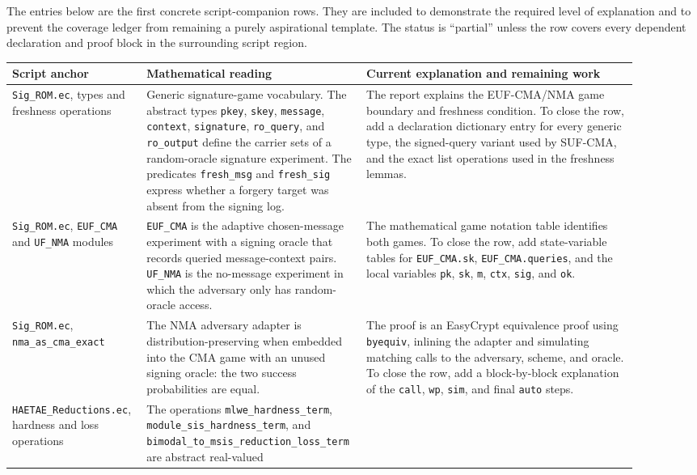 \documentclass[11pt]{report}
\DeclareRobustCommand{\file}[1]{\ifmmode\text{\nolinkurl{#1}}\else\nolinkurl{#1}\fi}
\DeclareRobustCommand{\ec}[1]{\ifmmode\text{\nolinkurl{#1}}\else\nolinkurl{#1}\fi}
\theoremstyle{definition}
\theoremstyle{plain}
\begin{document}
The entries below are the first concrete script-companion rows.  They are
included to demonstrate the required level of explanation and to prevent the
coverage ledger from remaining a purely aspirational template.  The status is
``partial'' unless the row covers every dependent declaration and proof block in
the surrounding script region.

\begin{longtable}{p{0.20\linewidth}p{0.28\linewidth}p{0.42\linewidth}}
\toprule
\textbf{Script anchor} & \textbf{Mathematical reading} & \textbf{Current explanation and remaining work} \\
\midrule
\file{Sig\_ROM.ec}, types and freshness operations &
Generic signature-game vocabulary.  The abstract types
\ec{pkey}, \ec{skey}, \ec{message}, \ec{context}, \ec{signature},
\ec{ro\_query}, and \ec{ro\_output} define the carrier sets of a random-oracle
signature experiment.  The predicates \ec{fresh\_msg} and \ec{fresh\_sig}
express whether a forgery target was absent from the signing log. &
The report explains the EUF-CMA/NMA game boundary and freshness condition.
To close the row, add a declaration dictionary entry for every generic type,
the signed-query variant used by SUF-CMA, and the exact list operations used in
the freshness lemmas. \\
\midrule
\file{Sig\_ROM.ec}, \ec{EUF\_CMA} and \ec{UF\_NMA} modules &
\ec{EUF\_CMA} is the adaptive chosen-message experiment with a signing oracle
that records queried message-context pairs.  \ec{UF\_NMA} is the no-message
experiment in which the adversary only has random-oracle access. &
The mathematical game notation table identifies both games.  To close the row,
add state-variable tables for \ec{EUF\_CMA.sk}, \ec{EUF\_CMA.queries}, and the
local variables \ec{pk}, \ec{sk}, \ec{m}, \ec{ctx}, \ec{sig}, and \ec{ok}. \\
\midrule
\file{Sig\_ROM.ec}, \ec{nma\_as\_cma\_exact} &
The NMA adversary adapter is distribution-preserving when embedded into the
CMA game with an unused signing oracle: the two success probabilities are
equal. &
The proof is an EasyCrypt equivalence proof using \ec{byequiv}, inlining the
adapter and simulating matching calls to the adversary, scheme, and oracle.  To
close the row, add a block-by-block explanation of the \ec{call}, \ec{wp},
\ec{sim}, and final \ec{auto} steps. \\
\midrule
\file{HAETAE\_Reductions.ec}, hardness and loss operations &
The operations \ec{mlwe\_hardness\_term},
\ec{module\_sis\_hardness\_term}, and
\ec{bimodal\_to\_msis\_reduction\_loss\_term} are abstract real-valued

\end{longtable}
\end{document}
